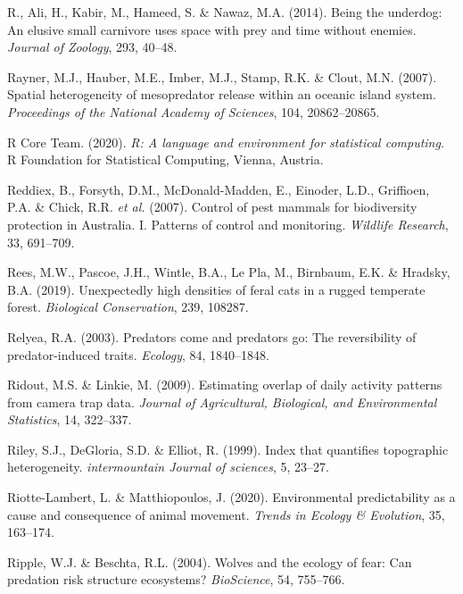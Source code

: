 \documentclass[11pt,a4paper,titlepage,twoside,openright]{style/unimelbthesis}
\begin{document}
\begin{mainmatter}
\leavevmode\hypertarget{ref-bischof2014being}{}%
R., Ali, H., Kabir, M., Hameed, S. \& Nawaz, M.A. (2014). Being the underdog: An elusive small carnivore uses space with prey and time without enemies. \emph{Journal of Zoology}, 293, 40--48.

\leavevmode\hypertarget{ref-rayner2007spatial}{}%
Rayner, M.J., Hauber, M.E., Imber, M.J., Stamp, R.K. \& Clout, M.N. (2007). Spatial heterogeneity of mesopredator release within an oceanic island system. \emph{Proceedings of the National Academy of Sciences}, 104, 20862--20865.

\leavevmode\hypertarget{ref-R}{}%
R Core Team. (2020). \emph{R: A language and environment for statistical computing}. R Foundation for Statistical Computing, Vienna, Austria.

\leavevmode\hypertarget{ref-reddiex2007control}{}%
Reddiex, B., Forsyth, D.M., McDonald-Madden, E., Einoder, L.D., Griffioen, P.A. \& Chick, R.R. \emph{et al.} (2007). Control of pest mammals for biodiversity protection in Australia. I. Patterns of control and monitoring. \emph{Wildlife Research}, 33, 691--709.

\leavevmode\hypertarget{ref-rees2019unexpectedly}{}%
Rees, M.W., Pascoe, J.H., Wintle, B.A., Le Pla, M., Birnbaum, E.K. \& Hradsky, B.A. (2019). Unexpectedly high densities of feral cats in a rugged temperate forest. \emph{Biological Conservation}, 239, 108287.

\leavevmode\hypertarget{ref-relyea2003predators}{}%
Relyea, R.A. (2003). Predators come and predators go: The reversibility of predator-induced traits. \emph{Ecology}, 84, 1840--1848.

\leavevmode\hypertarget{ref-ridout2009estimating}{}%
Ridout, M.S. \& Linkie, M. (2009). Estimating overlap of daily activity patterns from camera trap data. \emph{Journal of Agricultural, Biological, and Environmental Statistics}, 14, 322--337.

\leavevmode\hypertarget{ref-riley1999index}{}%
Riley, S.J., DeGloria, S.D. \& Elliot, R. (1999). Index that quantifies topographic heterogeneity. \emph{intermountain Journal of sciences}, 5, 23--27.

\leavevmode\hypertarget{ref-riotte-lambert2020environmental}{}%
Riotte-Lambert, L. \& Matthiopoulos, J. (2020). Environmental predictability as a cause and consequence of animal movement. \emph{Trends in Ecology \& Evolution}, 35, 163--174.

\leavevmode\hypertarget{ref-ripple2004wolves}{}%
Ripple, W.J. \& Beschta, R.L. (2004). Wolves and the ecology of fear: Can predation risk structure ecosystems? \emph{BioScience}, 54, 755--766.


\end{mainmatter}
\end{document}
